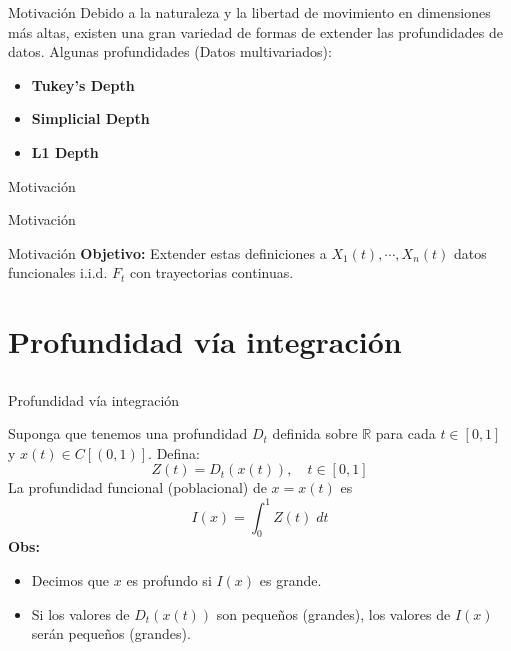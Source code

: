\documentclass[10pt]{beamer}
\begin{document}
{{\begin{frame}{Motivación}
    Debido a la naturaleza y la libertad de movimiento en dimensiones más altas, existen una gran variedad de formas de extender las profundidades de datos.
    Algunas profundidades (Datos multivariados): 
    \begin{itemize}
        \item \textbf{Tukey's Depth}
        \item \textbf{Simplicial Depth}
        \item \textbf{L1 Depth}
    \end{itemize}
\end{frame}

\begin{frame}{Motivación}
    
\end{frame}

\begin{frame}{Motivación}
    
\end{frame}

\begin{frame}{Motivación}
    \textbf{Objetivo:} Extender estas definiciones a $X_1(t),\cdots, X_n(t)$ datos funcionales i.i.d. $F_t$ con trayectorias continuas.\\[1cm]
\end{frame}

\section[Profundidad vía integración]{Profundidad vía integración}
\subsection{}

\begin{frame}{Profundidad vía integración}
    
    Suponga que tenemos una profundidad $D_t$ definida sobre $\mathbb{R}$ para cada $t\in [0,1]$ y $x(t)\in C[(0,1)]$. Defina:
    $$Z(t)=D_t(x(t)),\quad t\in [0,1]$$\pause
    La profundidad funcional (poblacional) de $x=x(t)$ es
    $$I(x)=\int_{0}^1Z(t)\;dt$$\pause
    \textbf{Obs:}
    \begin{itemize}
        \item Decimos que $x$ es profundo si $I(x)$ es grande.\pause
        \item Si los valores de $D_t(x(t))$ son pequeños (grandes), los valores de $I(x)$ serán pequeños (grandes).
    \end{itemize}
    

\end{frame}}}
\end{document}

